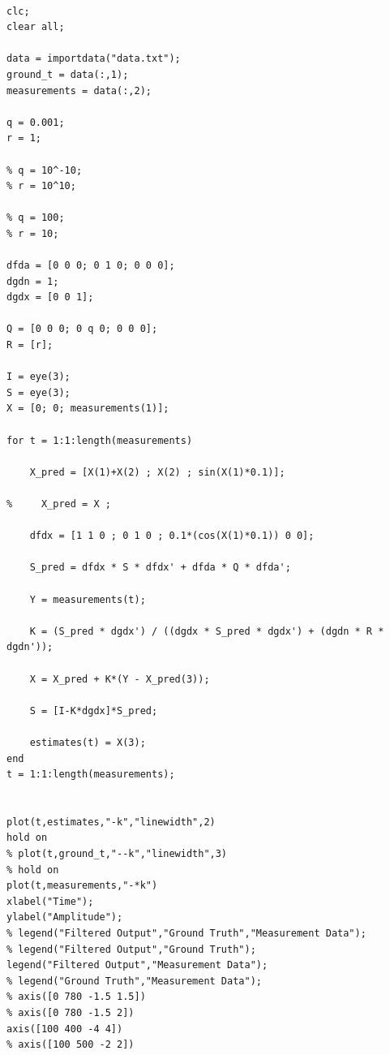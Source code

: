 \documentclass{article}
\begin{document}
\begin{lstlisting}[frame=single]

clc;
clear all;

data = importdata("data.txt");
ground_t = data(:,1);
measurements = data(:,2);

q = 0.001;
r = 1;

% q = 10^-10;
% r = 10^10;

% q = 100;
% r = 10;

dfda = [0 0 0; 0 1 0; 0 0 0];
dgdn = 1;
dgdx = [0 0 1];

Q = [0 0 0; 0 q 0; 0 0 0];
R = [r];

I = eye(3);
S = eye(3);
X = [0; 0; measurements(1)];

for t = 1:1:length(measurements)
    
    X_pred = [X(1)+X(2) ; X(2) ; sin(X(1)*0.1)];
    
%     X_pred = X ;
    
    dfdx = [1 1 0 ; 0 1 0 ; 0.1*(cos(X(1)*0.1)) 0 0];
    
    S_pred = dfdx * S * dfdx' + dfda * Q * dfda';
    
    Y = measurements(t);
    
    K = (S_pred * dgdx') / ((dgdx * S_pred * dgdx') + (dgdn * R * dgdn'));
    
    X = X_pred + K*(Y - X_pred(3));
    
    S = [I-K*dgdx]*S_pred;
    
    estimates(t) = X(3);
end
t = 1:1:length(measurements);


plot(t,estimates,"-k","linewidth",2)
hold on
% plot(t,ground_t,"--k","linewidth",3)
% hold on
plot(t,measurements,"-*k")
xlabel("Time");
ylabel("Amplitude");
% legend("Filtered Output","Ground Truth","Measurement Data");
% legend("Filtered Output","Ground Truth");
legend("Filtered Output","Measurement Data");
% legend("Ground Truth","Measurement Data");
% axis([0 780 -1.5 1.5])
% axis([0 780 -1.5 2])
axis([100 400 -4 4])
% axis([100 500 -2 2])

\end{lstlisting}
\end{document}
